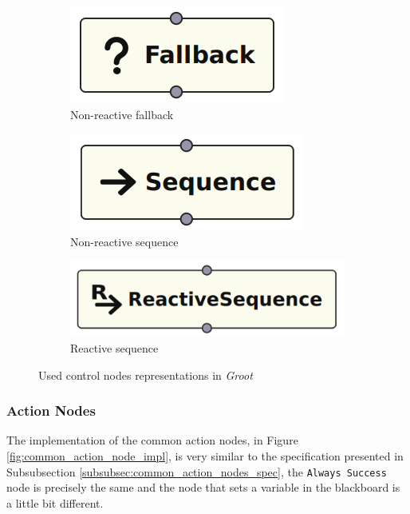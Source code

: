 \begin{figure}[!h]
    \centering
    \begin{subfigure}[b]{.32\linewidth}
        \centering
        \includegraphics[width=0.52\linewidth]{chapters/development/images/FallbackNode.png}
        \caption{Non-reactive fallback}
    \end{subfigure}
    \hfill
    \begin{subfigure}[b]{.32\linewidth}
        \centering
        \includegraphics[width=0.57\linewidth]{chapters/development/images/SequenceNode.png}
        \caption{Non-reactive sequence}
    \end{subfigure}
    \hfill
    \begin{subfigure}[b]{.32\linewidth}
        \centering
        \includegraphics[width=0.8\linewidth]{chapters/development/images/ReactiveSequenceNode.png}
        \caption{Reactive sequence}
    \end{subfigure}
    \caption{Used control nodes representations in \textit{Groot}}
    \label{fig:control_nodes_impl}
\end{figure}

\subsubsection{Action Nodes}

The implementation of the common action nodes, in Figure \ref{fig:common_action_node_impl}, is very similar to the specification presented in Subsubsection \ref{subsubsec:common_action_nodes_spec}, the \texttt{Always Success} node is precisely the same and the node that sets a variable in the blackboard is a little bit different.

